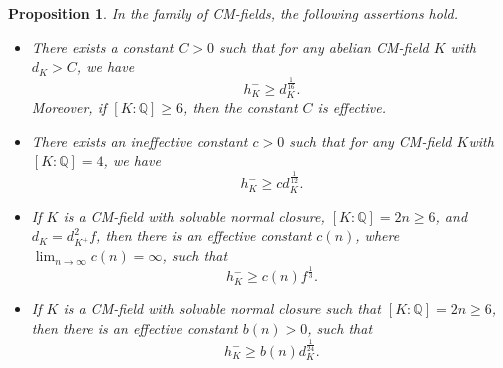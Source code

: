 \documentclass[12pt]{amsart}
\newtheorem{proposition}[theorem]{Proposition}
\theoremstyle{definition}
\numberwithin{equation}{section}
\begin{document}
\begin{proposition} \label{proposition, bounds for hk-}
In the family of CM-fields, the following assertions hold.
\begin{itemize}
	\item[(i)] There exists a constant $C>0$ such that for any abelian CM-field $K$ with $d_K >C$, we have
\begin{equation*}
h_{K}^{-} \geq d_K^{\frac{1}{16}}.
\end{equation*} 
Moreover, if $[K:\mathbb{Q}] \geq 6$, then the constant $C$ is effective.
	\item[(ii)] There exists an ineffective constant $c>0$ such that for any CM-field $K $with $[K:\mathbb{Q}]=4$, we have
	\begin{equation*}
	h_K^- \geq c d_K^{\frac{1}{12}}.
	\end{equation*}	
\item[(iii)] If $K$ is a CM-field with solvable normal closure, $[K:\mathbb{Q}]=2n \geq 6$,  and $d_K=d_{K^+}^2f$, then there is an effective {constant} $c(n)$, where $\lim_{n \rightarrow \infty} c(n) =\infty$, such that
\begin{equation*}
h_K^- \geq c(n) f^{\frac{1}{3}}.
\end{equation*}
	
\item[(iv)] If $K$ is a CM-field with solvable normal closure such that $[K:\mathbb{Q}]=2n \geq 6$, then there is an effective {constant} $b(n) >0$, such that 
\begin{equation*}
h_K^- \geq b(n) d_K^{\frac{1}{24}}.
\end{equation*}
\end{itemize}
\end{proposition}
\end{document}
